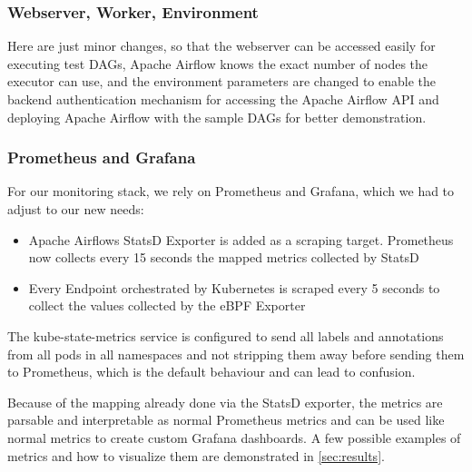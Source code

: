\documentclass[a4paper,journal]{IEEEtran}
\begin{document}
	\subsubsection{Webserver, Worker, Environment}
	Here are just minor changes, so that the webserver can be accessed easily for executing test DAGs, Apache Airflow knows the exact number of nodes the executor can use, and the environment parameters are changed to enable the backend authentication mechanism for accessing the Apache Airflow API and deploying Apache Airflow with the sample DAGs for better demonstration. 
	
	\subsubsection{Prometheus and Grafana}
	
	For our monitoring stack, we rely on Prometheus and Grafana, which we had to adjust to our new needs:
	
	\begin{itemize}
		\item Apache Airflows StatsD Exporter is added as a scraping target. Prometheus now collects every 15 seconds the mapped metrics collected by StatsD
		\item Every Endpoint orchestrated by Kubernetes is scraped every 5 seconds to collect the values collected by the eBPF Exporter
	\end{itemize}
	
	The kube-state-metrics service is configured to send all labels and annotations from all pods in all namespaces and not stripping them away before sending them to Prometheus, which is the default behaviour and can lead to confusion.
	
	Because of the mapping already done via the StatsD exporter, the metrics are parsable and interpretable as normal Prometheus metrics and can be used like normal metrics to create custom Grafana dashboards. A few possible examples of metrics and how to visualize them are demonstrated in \autoref{sec:results}.
	
\end{document}
